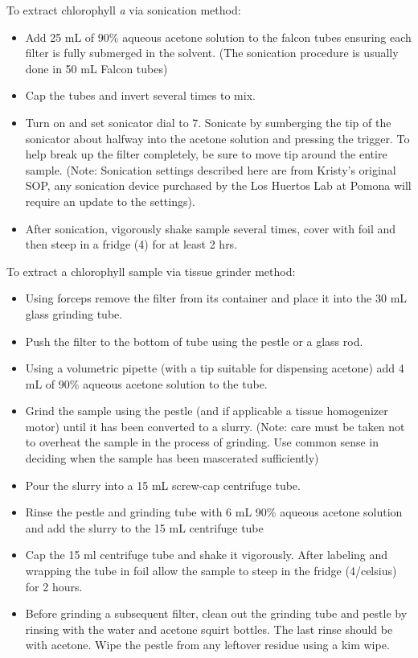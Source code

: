 \documentclass[12pt]{../SOP3_alpha}
\begin{document}
\NP To extract chlorophyll \textit{a} via sonication method:
\begin{itemize}
\item Add 25 mL of 90\% aqueous acetone solution to the falcon tubes ensuring each filter is fully submerged in the solvent. (The sonication procedure is usually done in 50 mL Falcon tubes)
\item Cap the tubes and invert several times to mix. 
\item Turn on and set sonicator dial to 7. Sonicate by sumberging the tip of the sonicator about halfway into the acetone solution and pressing the trigger. To help break up the filter completely, be sure to move tip around the entire sample. (Note: Sonication settings described here are from Kristy's original SOP, any sonication device purchased by the Los Huertos Lab at Pomona will require an update to the settings).
\item After sonication, vigorously shake sample several times, cover with foil and then steep in a fridge (4\celsius) for at least 2 hrs.
\end{itemize}

\NP To extract a chlorophyll sample via tissue grinder method: 
\begin{itemize}
\item Using forceps remove the filter from its container and place it into the 30 mL glass grinding tube.
\item Push the filter to the bottom of tube using the pestle or a glass rod.
\item Using a volumetric pipette (with a tip suitable for dispensing acetone) add 4 mL of 90\% aqueous acetone solution to the tube.
\item Grind the sample using the pestle (and if applicable a tissue homogenizer motor) until it has been converted to a slurry. (Note: care must be taken not to overheat the sample in the process of grinding. Use common sense in deciding when the sample has been mascerated sufficiently)
\item Pour the slurry into a 15 mL screw-cap centrifuge tube. 
\item Rinse the pestle and grinding tube with 6 mL 90\% aqueous acetone solution and add the slurry to the 15 mL centrifuge tube
\item Cap the 15 ml centrifuge tube and shake it vigorously. After labeling and wrapping the tube in foil allow the sample to steep in the fridge (4/celsius) for 2 hours.
\item Before grinding a subsequent filter, clean out the grinding tube and pestle by rinsing with the water and acetone squirt bottles. The last rinse should be with acetone. Wipe the pestle from any leftover residue using a kim wipe.
\end{itemize}
\end{document}
